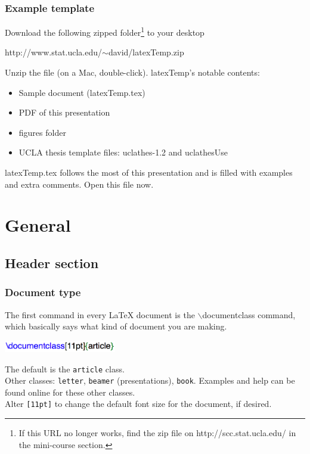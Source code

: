 \documentclass[slidestop,compress,mathserif]{beamer}
\begin{document}
\begin{frame} \frametitle{Example template}
Download the following zipped folder\footnote{If this URL no longer works, find the zip file on {\color{highlight}http://scc.stat.ucla.edu/} in the mini-course section.} to your desktop \\
\begin{center}
{\color{highlight} http://www.stat.ucla.edu/$\sim$david/latexTemp.zip}
\end{center}
Unzip the file (on a Mac, double-click). {\color{highlight}latexTemp}'s notable contents:
\begin{itemize}
\item Sample document ({\color{highlight}latexTemp.tex})
\item PDF of this presentation
\item {\color{highlight}figures} folder
\item UCLA thesis template files: {\color{highlight}uclathes-1.2} and {\color{highlight}uclathesUse}
\end{itemize}
{\color{highlight}latexTemp.tex} follows the most of this presentation and is filled with examples and extra comments. Open this file now.
\end{frame}



\section[General]{General}

\subsection[Header section]{Header section}
\begin{frame} \frametitle{Document type}
The first command in every LaTeX document is the {\color{command}$\backslash$documentclass} command, which basically says what kind of document you are making.
\begin{center}
\includegraphics[height=0.2in]{basicsOfLatex/general/documentClass}
\end{center}
The default is the \texttt{\color{highlight}article} class.
\vspace{5mm}\\
Other classes: \texttt{\color{highlight}letter}, \texttt{\color{highlight}beamer} (presentations), \texttt{\color{highlight}book}. Examples and help can be found online for these other classes.
\vspace{5mm} \\
Alter \texttt{\color{highlight}[11pt]} to change the default font size for the document, if desired.
\end{frame}
\end{document}
